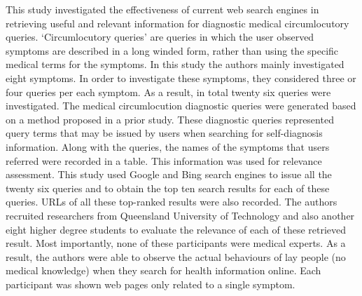 \documentclass[]{article}
\begin{document}
This study investigated the effectiveness of current web search engines in retrieving useful and relevant information for diagnostic medical circumlocutory queries. ‘Circumlocutory queries’ are queries in which the user observed symptoms are described in a long winded form, rather than using the specific medical terms for the symptoms. In this study the authors mainly investigated eight symptoms. In order to investigate these symptoms, they considered three or four queries per each symptom. As a result, in total twenty six queries were investigated. The  medical circumlocution diagnostic queries were generated based on a method proposed in a prior study. These diagnostic queries represented query terms that may be issued by users when searching for self-diagnosis information.  Along with the queries, the names of the symptoms that users referred were recorded in a table. This information was used for relevance assessment. This study used Google and Bing search engines to issue all the twenty six queries and to obtain the top ten search results for each of these queries. URLs of all these top-ranked results were also recorded. The authors recruited researchers from Queensland University of Technology and also another eight higher degree students to evaluate the relevance of each of these retrieved result. Most importantly, none of these participants were medical experts. As a result, the authors were able to observe the actual behaviours of lay people (no medical knowledge) when they search for health information online. Each participant was shown web pages only related to a single symptom. 
\end{document}
